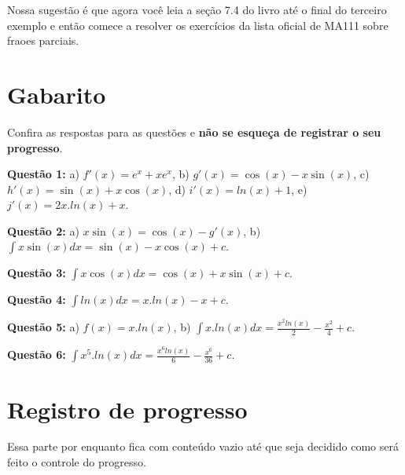 \documentclass[main_estudante.tex]{subfiles}
\begin{document}
Nossa sugestão é que agora você leia a seção 7.4 do livro  até o final do terceiro exemplo e então comece a resolver os exercícios da lista oficial de MA111 sobre fraoes parciais.

\newpage

\section{Gabarito}

Confira as respostas para as questões e \textbf{não se esqueça de registrar o seu progresso}.

\noindent\textbf{Questão 1:} a) $f'(x)=e^x+xe^x$, b) $g'(x)=\cos(x)-x\sin(x)$, c) $h'(x)=\sin(x)+x\cos(x)$, d) $i'(x)=ln(x)+1$, e) $j'(x)=2x.ln(x)+x$.

\noindent\textbf{Questão 2:} a) $x\sin(x)=\cos(x)-g'(x)$, b) $\int x\sin(x) dx = \sin(x)-x\cos(x)+c$.

\noindent\textbf{Questão 3:} $\int x\cos(x) dx = \cos(x)+x\sin(x)+c$.

\noindent\textbf{Questão 4:} $\int ln(x) dx = x.ln(x)-x+c$.

\noindent\textbf{Questão 5:} a) $f(x)=x.ln(x)$, b) $\int x.ln(x) dx = \frac{x^2 ln(x)}{2}-\frac{x^2}{4}+c$.

\noindent\textbf{Questão 6:} $\int x^5.ln(x) dx = \frac{x^6 ln(x)}{6}-\frac{x^6}{36}+c$.

\section{Registro de progresso}

Essa parte por enquanto fica com conteúdo vazio até que seja decidido como será feito o controle do progresso.

\vspace{5cm}
\end{document}

